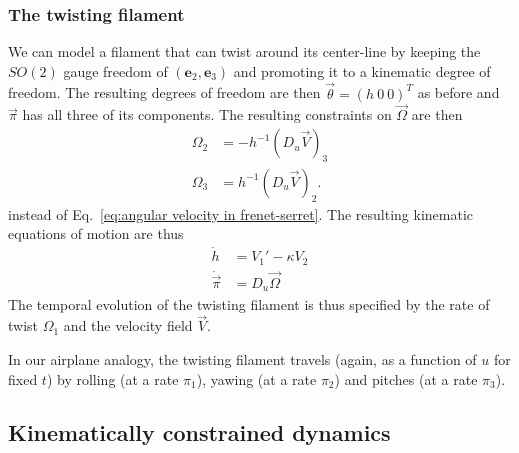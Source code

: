 

\subsubsection*{The twisting filament} \label{sec:twisting filament}

We can model a filament that can twist around its center-line by keeping the $SO(2)$ gauge freedom of $(\mathbf{e}_2, \mathbf{e}_3)$ and promoting it to a kinematic degree of freedom. The resulting degrees of freedom are then $\vec{\theta} = (h\ 0\ 0)^T$ as before and $\vec{\pi}$ has all three of its components. The resulting constraints on $\vec{\Omega}$ are then
\begin{subequations} \label{eq:angular velocity for twisting filament}
\begin{align}
\Omega_2 & = - h^{-1} (D_u \vec{V})_3 \\
\Omega_3 & = h^{-1} (D_u \vec{V})_2.
\end{align}
\end{subequations}
instead of Eq.~\ref{eq:angular velocity in frenet-serret}. The resulting kinematic equations of motion are thus
\begin{subequations} \label{eq:twisting filament kinematic equtions of motion}
\begin{align}
\dot{h} & = V_1' - \kappa V_2 \\
\dot{\vec{\pi}} & = D_u \vec{\Omega}
\end{align}
\end{subequations}
The temporal evolution of the twisting filament is thus specified by the rate of twist $\Omega_1$ and the velocity field $\vec{V}$.

In our airplane analogy, the twisting filament travels (again, as a function of $u$ for fixed $t$) by rolling (at a rate $\pi_1$), yawing (at a rate $\pi_2$) and pitches (at a rate $\pi_3$).

\subsection{Kinematically constrained dynamics} \label{sec:Kinematically constrained dynamics (cosserat rod)}

